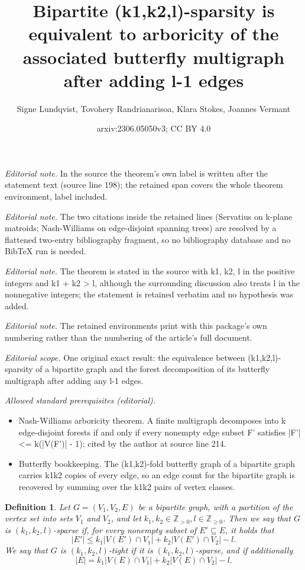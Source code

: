\documentclass[10pt,a4paper]{article}
\title{Bipartite (k1,k2,l)-sparsity is equivalent to arboricity of the associated butterfly multigraph after adding l-1 edges}
\author{Signe Lundqvist, Tovohery Randrianarisoa, Klara Stokes, Joannes Vermant}
\date{arxiv:2306.05050v3; CC BY 4.0}
\newtheorem{definition}[theorem]{Definition}
\begin{document}
\maketitle
\noindent\textit{Editorial note.} In the source the theorem's own label is written after the statement text (source line 198); the retained span covers the whole theorem environment, label included.\par\medskip
\noindent\textit{Editorial note.} The two citations inside the retained lines (Servatius on k-plane matroids; Nash-Williams on edge-disjoint spanning trees) are resolved by a flattened two-entry bibliography fragment, so no bibliography database and no BibTeX run is needed.\par\medskip
\noindent\textit{Editorial note.} The theorem is stated in the source with k1, k2, l in the positive integers and k1 + k2 > l, although the surrounding discussion also treats l in the nonnegative integers; the statement is retained verbatim and no hypothesis was added.\par\medskip
\noindent\textit{Editorial note.} The retained environments print with this package's own numbering rather than the numbering of the article's full document.\par\medskip
\noindent\textit{Editorial scope.} One original exact result: the equivalence between (k1,k2,l)-sparsity of a bipartite graph and the forest decomposition of its butterfly multigraph after adding any l-1 edges.\par\medskip
\noindent\textit{Allowed standard prerequisites (editorial).}\begin{itemize}
\item Nash-Williams arboricity theorem. A finite multigraph decomposes into k edge-disjoint forests if and only if every nonempty edge subset F' satisfies |F'| <= k(|V(F')| - 1); cited by the author at source line 214.
\item Butterfly bookkeeping. The (k1,k2)-fold butterfly graph of a bipartite graph carries k1k2 copies of every edge, so an edge count for the bipartite graph is recovered by summing over the k1k2 pairs of vertex classes.
\end{itemize}\medskip
\begin{definition}\label{def: bipartite def}
    Let $G=(V_1, V_2, E)$ be a bipartite graph, with a partition of the vertex set into sets $V_1$ and $V_2$, and let $k_1, k_2 \in \mathbb{Z}_{>0}, l\in \mathbb{Z}_{\geq 0}$. Then we say that $G$ is $(k_1, k_2, l)$-sparse if, for every nonempty subset of $E' \subseteq E$, it holds that
\begin{equation*}
     \vert E'\vert \leq k_1 \vert V(E') \cap V_1 \vert +  k_2 \vert V(E')\cap V_2 \vert - l.
\end{equation*}
    We say that $G$ is $(k_1, k_2, l)$-tight if it is $(k_1, k_2, l)$-sparse, and if additionally
\begin{equation*}
     \vert E\vert = k_1 \vert V(E) \cap V_1 \vert +  k_2 \vert V(E)\cap V_2 \vert - l.
\end{equation*}
\end{definition}
\end{document}
